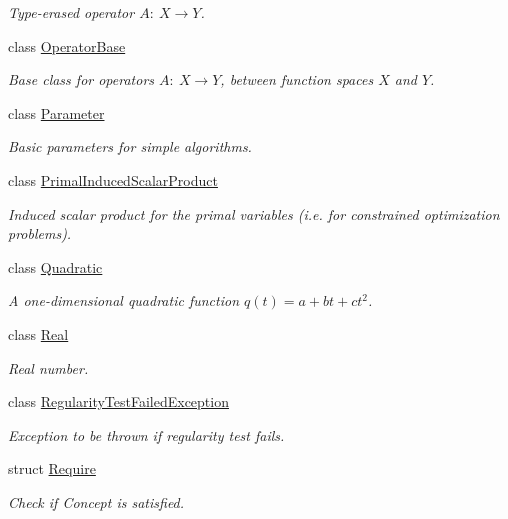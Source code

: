 \begin{DoxyCompactItemize}
\begin{DoxyCompactList}\small\item\em Type-\/erased operator $A:\ X \to Y $. \end{DoxyCompactList}\item 
class \hyperlink{classSpacy_1_1OperatorBase}{Operator\+Base}
\begin{DoxyCompactList}\small\item\em Base class for operators $A:\ X\rightarrow Y$, between function spaces $X$ and $Y$. \end{DoxyCompactList}\item 
class \hyperlink{classSpacy_1_1Parameter}{Parameter}
\begin{DoxyCompactList}\small\item\em Basic parameters for simple algorithms. \end{DoxyCompactList}\item 
class \hyperlink{classSpacy_1_1PrimalInducedScalarProduct}{Primal\+Induced\+Scalar\+Product}
\begin{DoxyCompactList}\small\item\em Induced scalar product for the primal variables (i.\+e. for constrained optimization problems). \end{DoxyCompactList}\item 
class \hyperlink{classSpacy_1_1Quadratic}{Quadratic}
\begin{DoxyCompactList}\small\item\em A one-\/dimensional quadratic function $q(t) = a + bt + ct^2$. \end{DoxyCompactList}\item 
class \hyperlink{classSpacy_1_1Real}{Real}
\begin{DoxyCompactList}\small\item\em Real number. \end{DoxyCompactList}\item 
class \hyperlink{classSpacy_1_1RegularityTestFailedException}{Regularity\+Test\+Failed\+Exception}
\begin{DoxyCompactList}\small\item\em Exception to be thrown if regularity test fails. \end{DoxyCompactList}\item 
struct \hyperlink{structSpacy_1_1Require}{Require}
\begin{DoxyCompactList}\small\item\em Check if Concept is satisfied. \end{DoxyCompactList}\item 

\end{DoxyCompactItemize}
